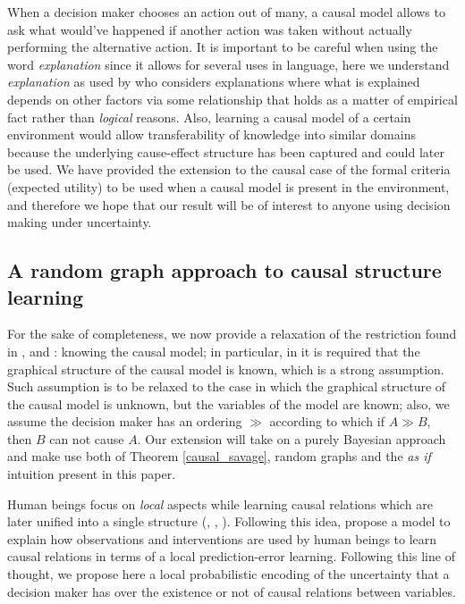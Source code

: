 \documentclass[review]{elsarticle}
\begin{document}
When a decision maker chooses an action out of many, a causal model allows to ask what would've happened if another action was taken without actually performing the alternative action. It is important to be careful when using the word \textit{explanation} since it allows for several uses in language, here we understand \textit{explanation} as used by \cite{woodward2005making} who considers explanations where what is explained depends on other factors via some relationship that holds as a matter of empirical fact rather than \textit{logical} reasons. Also, learning a causal model of a certain environment would allow transferability of knowledge into similar domains because the underlying cause-effect structure has been captured and could later be used. We have provided the extension to the causal case of the formal criteria (expected utility) to be used when a causal model is present in the environment, and therefore we hope that our result will be of interest to anyone using decision making under uncertainty. 

\subsection{A random graph approach to causal structure learning}
\label{random_graphs}
For the sake of completeness, we now provide a relaxation of the restriction found in \cite{lattimoreNIPS2016}, \cite{sen2017identifying} and \cite{gonzalez2018playing}: knowing the causal model; in particular, in \cite{gonzalez2018playing} it is required that the graphical structure of the causal model is known, which is a strong assumption. Such assumption is to be relaxed to the case in which the graphical structure of the causal model is unknown, but the variables of the model are known; also, we assume the decision maker has an ordering $\gg$ according to which if $A \gg B$, then $B$ can not cause $A$. Our extension will take on a purely Bayesian approach and make use both of Theorem \ref{causal_savage}, random graphs and the \textit{as if} intuition present in this paper.

Human beings focus on \textit{local} aspects while learning causal relations which are later unified into a single structure (\cite{fernbach2009causal}, \cite{waldmann2008causal},  \cite{danks2014unifying}). Following this idea, \cite{wellen2012learning} propose a model to explain how observations  and interventions are used by human beings to learn causal relations in terms of a local prediction-error learning. Following this line of thought, we propose here a local probabilistic encoding of the uncertainty that a decision maker has over the existence or not of causal relations between variables.
\end{document}
